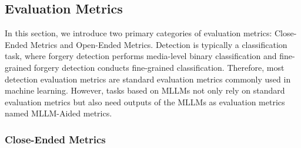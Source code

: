 \subsection{Evaluation Metrics}
In this section, we introduce two primary categories of evaluation metrics: Close-Ended Metrics and Open-Ended Metrics. Detection is typically a classification task, where forgery detection performs media-level binary classification and fine-grained forgery detection conducts fine-grained classification. Therefore, most detection evaluation metrics are standard evaluation metrics commonly used in machine learning. However, tasks based on MLLMs not only rely on standard evaluation metrics but also need outputs of the MLLMs as evaluation metrics named MLLM-Aided metrics.
\subsubsection{Close-Ended Metrics}
